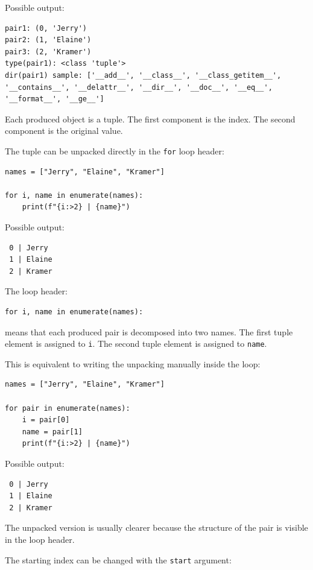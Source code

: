 \documentclass[a4paper,twoside]{report}
\begin{document}
Possible output:

\begin{verbatim}
pair1: (0, 'Jerry')
pair2: (1, 'Elaine')
pair3: (2, 'Kramer')
type(pair1): <class 'tuple'>
dir(pair1) sample: ['__add__', '__class__', '__class_getitem__',
'__contains__', '__delattr__', '__dir__', '__doc__', '__eq__',
'__format__', '__ge__']
\end{verbatim}

Each produced object is a tuple. The first component is the index. The second component is the original value.

The tuple can be unpacked directly in the \texttt{for} loop header:

\begin{verbatim}
names = ["Jerry", "Elaine", "Kramer"]

for i, name in enumerate(names):
    print(f"{i:>2} | {name}")
\end{verbatim}

Possible output:

\begin{verbatim}
 0 | Jerry
 1 | Elaine
 2 | Kramer
\end{verbatim}

The loop header:

\begin{verbatim}
for i, name in enumerate(names):
\end{verbatim}

means that each produced pair is decomposed into two names. The first tuple element is assigned to \texttt{i}. The second tuple element is assigned to \texttt{name}.

This is equivalent to writing the unpacking manually inside the loop:

\begin{verbatim}
names = ["Jerry", "Elaine", "Kramer"]

for pair in enumerate(names):
    i = pair[0]
    name = pair[1]
    print(f"{i:>2} | {name}")
\end{verbatim}

Possible output:

\begin{verbatim}
 0 | Jerry
 1 | Elaine
 2 | Kramer
\end{verbatim}

The unpacked version is usually clearer because the structure of the pair is visible in the loop header.

The starting index can be changed with the \texttt{start} argument:
\end{document}
